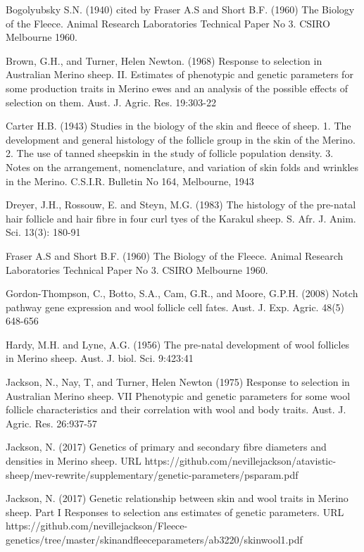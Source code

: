 \documentclass[titlepage]{article}  %
\begin{document}
\begin{thebibliography}{99}

 Bogolyubsky S.N. (1940) cited by Fraser A.S and Short B.F. (1960) The Biology of the Fleece. Animal Research Laboratories Technical Paper No 3. CSIRO Melbourne 1960.

Brown, G.H., and Turner, Helen Newton. (1968) Response to selection in Australian Merino sheep. II. Estimates of phenotypic and genetic parameters for some production traits in Merino ewes and an analysis of the possible effects of selection on them. Aust. J. Agric. Res. 19:303-22

Carter H.B. (1943) Studies in the biology of the skin and fleece of sheep. 1. The development and general histology of the follicle group in the skin of the Merino. 2. The use of tanned sheepskin in the study of follicle population density. 3. Notes on the arrangement, nomenclature, and variation of skin folds and wrinkles in the Merino. C.S.I.R. Bulletin No 164, Melbourne, 1943

Dreyer, J.H., Rossouw, E. and Steyn, M.G. (1983) The histology of the pre-natal hair follicle and hair fibre in four curl tyes of the Karakul sheep.  S. Afr. J. Anim. Sci. 13(3): 180-91

Fraser A.S and Short B.F. (1960) The Biology of the Fleece. Animal Research Laboratories Technical Paper No 3. CSIRO Melbourne 1960.

Gordon-Thompson, C., Botto, S.A., Cam, G.R., and Moore, G.P.H. (2008) Notch pathway gene expression and wool follicle cell fates. Aust. J. Exp. Agric. 48(5) 648-656

Hardy, M.H. and Lyne, A.G. (1956) The pre-natal development of wool follicles in Merino sheep. Aust. J. biol. Sci. 9:423:41

Jackson, N., Nay, T, and Turner, Helen Newton (1975) Response to selection in Australian Merino sheep. VII Phenotypic and genetic parameters for some wool follicle characteristics and their correlation with wool and body traits. Aust. J. Agric. Res. 26:937-57

Jackson, N. (2017) Genetics of primary and secondary fibre diameters and densities in Merino sheep. URL https://github.com/nevillejackson/atavistic-sheep/mev-rewrite/supplementary/genetic-parameters/psparam.pdf

Jackson, N. (2017) Genetic relationship between skin and wool traits in Merino sheep. Part I Responses to selection ans estimates of genetic parameters. URL https://github.com/nevillejackson/Fleece-genetics/tree/master/skinandfleeceparameters/ab3220/skinwool1.pdf


\end{thebibliography}
\end{document}
